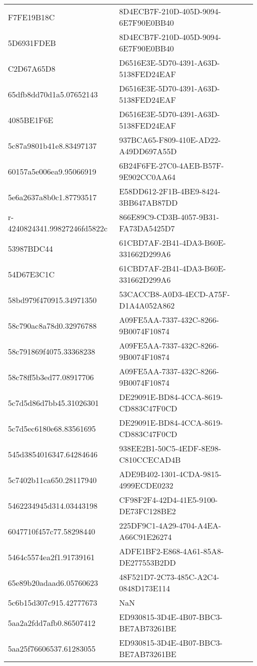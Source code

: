 \begin{tabular}{ll}
F7FE19B18C & 8D4ECB7F-210D-405D-9094-6E7F90E0BB40 \\
5D6931FDEB & 8D4ECB7F-210D-405D-9094-6E7F90E0BB40 \\
C2D67A65D8 & D6516E3E-5D70-4391-A63D-5138FED24EAF \\
65dfb8dd70d1a5.07652143 & D6516E3E-5D70-4391-A63D-5138FED24EAF \\
4085BE1F6E & D6516E3E-5D70-4391-A63D-5138FED24EAF \\
5c87a9801b41e8.83497137 & 937BCA65-F809-410E-AD22-A49DD697A55D \\
60157a5e006ea9.95066919 & 6B24F6FE-27C0-4AEB-B57F-9E902CC0AA64 \\
5e6a2637a8b0c1.87793517 & E58DD612-2F1B-4BE9-8424-3BB647AB87DD \\
r-4240824341.99827246fd5822c & 866E89C9-CD3B-4057-9B31-FA73DA5425D7 \\
53987BDC44 & 61CBD7AF-2B41-4DA3-B60E-331662D299A6 \\
54D67E3C1C & 61CBD7AF-2B41-4DA3-B60E-331662D299A6 \\
58bd979f470915.34971350 & 53CACCB8-A0D3-4ECD-A75F-D1A4A052A862 \\
58c790ac8a78d0.32976788 & A09FE5AA-7337-432C-8266-9B0074F10874 \\
58c791869f4075.33368238 & A09FE5AA-7337-432C-8266-9B0074F10874 \\
58c78ff5b3ed77.08917706 & A09FE5AA-7337-432C-8266-9B0074F10874 \\
5c7d5d86d7bb45.31026301 & DE29091E-BD84-4CCA-8619-CD883C47F0CD \\
5c7d5ec6180e68.83561695 & DE29091E-BD84-4CCA-8619-CD883C47F0CD \\
545d3854016347.64284646 & 938EE2B1-50C5-4EDF-8E98-C810CCECAD4B \\
5c7402b11ca650.28117940 & ADE9B402-1301-4CDA-9815-4999ECDE0232 \\
5462234945d314.03443198 & CF98F2F4-42D4-41E5-9100-DE73FC128BE2 \\
6047710f457c77.58298440 & 225DF9C1-4A29-4704-A4EA-A66C91E26274 \\
5464c5574ea2f1.91739161 & ADFE1BF2-E868-4A61-85A8-DE277553B2DD \\
65e89b20adaad6.05760623 & 48F521D7-2C73-485C-A2C4-0848D173E114 \\
5c6b15d307c915.42777673 & NaN \\
5aa2a2fdd7afb0.86507412 & ED930815-3D4E-4B07-BBC3-BE7AB73261BE \\
5aa25f76606537.61283055 & ED930815-3D4E-4B07-BBC3-BE7AB73261BE \\

\end{tabular}
